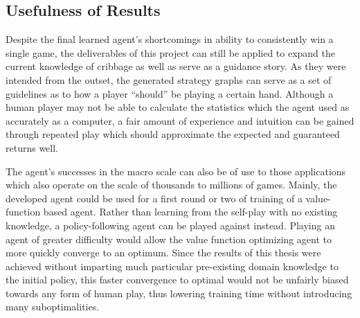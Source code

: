
\subsection{Usefulness of Results}
\label{sec:disc-usefulness}


Despite the final learned agent's shortcomings in ability to consistently win
a single game,
the deliverables of this project can still be applied to expand the current
knowledge of cribbage as well as serve as a guidance story.
%
As they were intended from the outset,
the generated strategy graphs can serve as a set of guidelines as to how a
player ``should'' be playing a certain hand.
%
Although a human player may not be able to calculate the statistics which the
agent used as accurately as a computer,
a fair amount of experience and intuition can be gained through repeated
play which should approximate the expected and guaranteed returns well.

The agent's successes in the macro scale can also be of use to those
applications which also operate on the scale of thousands to millions of games.
%
Mainly,
the developed agent could be used for a first round or two of training
of a value-function based agent.
%
Rather than learning from the self-play with no existing knowledge,
a policy-following agent can be played against instead.
%
Playing an agent of greater difficulty would allow the value function optimizing
agent to more quickly converge to an optimum.
%
Since the results of this thesis were achieved without imparting much particular 
pre-existing domain knowledge to the initial policy,
this faster convergence to optimal would not be unfairly biased
towards any form of human play,
thus lowering training time without introducing many suboptimalities.





%
